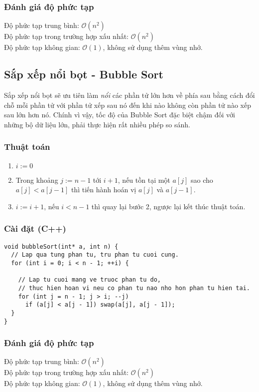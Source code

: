 \documentclass[]{article}
\begin{document}
\subsubsection{Đánh giá độ phức tạp}
Độ phức tạp trung bình: $\mathcal{O}(n^2)$
\\
Độ phức tạp trong trường hợp xấu nhất: $\mathcal{O}(n^2)$
\\
Độ phức tạp không gian: $\mathcal{O}(1)$, không sử dụng thêm vùng nhớ.

\subsection{Sắp xếp nổi bọt - Bubble Sort}
Sắp xếp nổi bọt sẽ ưu tiên làm \textit{nổi} các phần tử lớn hơn về phía sau bằng cách đổi chỗ mỗi phần tử với phần tử xếp sau nó đến khi nào không còn phần tử nào xếp sau lớn hơn nó. Chính vì vậy, tốc độ của Bubble Sort đặc biệt chậm đối với những bộ dữ liệu lớn, phải thực hiện rất nhiều phép so sánh.

\subsubsection{Thuật toán}
\begin{enumerate}
\item $i := 0$
\item Trong khoảng $j := n - 1$ tới $i + 1$, nếu tồn tại một $a[j]$ sao cho $a[j] < a[j - 1]$ thì tiến hành hoán vị $a[j]$ và $a[j - 1]$.
\item $i := i + 1$, nếu $i < n - 1$ thì quay lại bước 2, ngược lại kết thúc thuật toán.
\end{enumerate}

\subsubsection{Cài đặt (C++)}
\begin{lstlisting}
void bubbleSort(int* a, int n) {
  // Lap qua tung phan tu, tru phan tu cuoi cung.
  for (int i = 0; i < n - 1; ++i) {

    // Lap tu cuoi mang ve truoc phan tu do,
    // thuc hien hoan vi neu co phan tu nao nho hon phan tu hien tai.
    for (int j = n - 1; j > i; --j)
      if (a[j] < a[j - 1]) swap(a[j], a[j - 1]);
  }
}
\end{lstlisting}

\subsubsection{Đánh giá độ phức tạp}
Độ phức tạp trung bình: $\mathcal{O}(n^2)$
\\
Độ phức tạp trong trường hợp xấu nhất: $\mathcal{O}(n^2)$
\\
Độ phức tạp không gian: $\mathcal{O}(1)$, không sử dụng thêm vùng nhớ.
\end{document}
